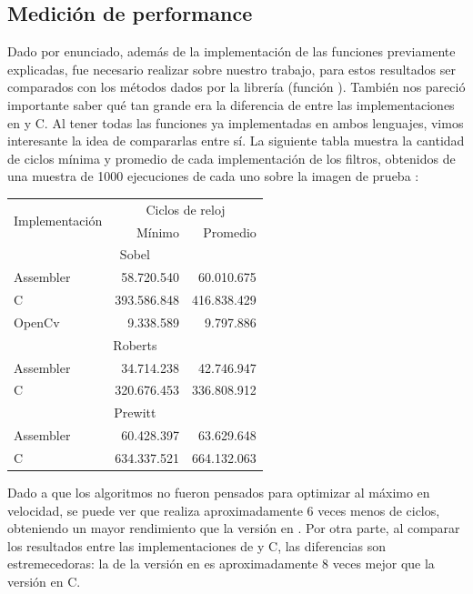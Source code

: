 \subsection{Medici\'on de performance}
Dado por enunciado, adem\'as de la implementaci\'on de las funciones previamente explicadas, fue necesario realizar 
 sobre nuestro trabajo, para estos resultados ser comparados con los m\'etodos dados por 
la librer\'ia  (funci\'on ). Tambi\'en nos pareci\'o importante saber qu\'e tan grande era la 
diferencia de  entre las implementaciones en  y C. Al tener todas las 
funciones ya implementadas en ambos lenguajes, vimos interesante la idea de compararlas entre s\'i. La siguiente tabla
muestra la cantidad de ciclos m\'inima y promedio de cada implementaci\'on de los filtros, obtenidos de una muestra de
1000 ejecuciones de cada uno sobre la imagen de prueba :
\begin{center}
\begin{tabular}{|l|r|r|}
\hline
\multirow{2}{*}{Implementaci\'on}&\multicolumn{2}{|c|}{Ciclos de reloj} \\
\cline{2-3}
&M\'inimo	&	Promedio \\
\hline
\multicolumn{3}{|c|}{Sobel}\\
\hline
Assembler	&	58.720.540	&	60.010.675 \\
\hline
C			&	393.586.848	&	416.838.429 \\
\hline
OpenCv		&	9.338.589	& 	9.797.886 \\
\hline
\multicolumn{3}{|c|}{Roberts}\\
\hline
Assembler	&	34.714.238	&	42.746.947 \\
\hline
C			&	320.676.453	&	336.808.912 \\
\hline
\multicolumn{3}{|c|}{Prewitt}\\
\hline
Assembler	&	60.428.397	&	63.629.648 \\
\hline
C			&	634.337.521	&	664.132.063 \\
\hline
\end{tabular}
\end{center}

Dado a que los algoritmos no fueron pensados para optimizar al m\'aximo en velocidad, se puede ver que  
realiza aproximadamente 6 veces menos de ciclos, obteniendo un mayor rendimiento que la versi\'on en 
. Por otra parte, al comparar los resultados entre las implementaciones de  
y C, las diferencias son estremecedoras: la  de la versi\'on en  es 
aproximadamente 8 veces mejor que la versi\'on en C.

\pagebreak
